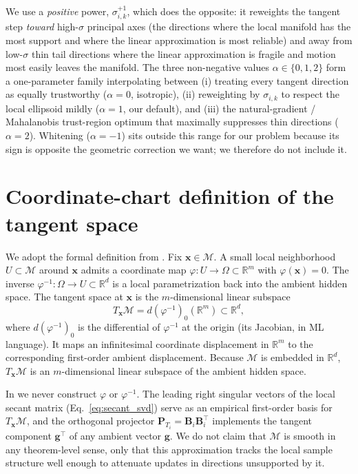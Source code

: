 We use a \emph{positive} power, $\sigma_{i,k}^{+1}$, which does the opposite: it reweights the tangent step \emph{toward} high-$\sigma$ principal axes (the directions where the local manifold has the most support and where the linear approximation is most reliable) and away from low-$\sigma$ thin tail directions where the linear approximation is fragile and motion most easily leaves the manifold. The three non-negative values $\alpha \in \{0, 1, 2\}$ form a one-parameter family interpolating between (i) treating every tangent direction as equally trustworthy ($\alpha = 0$, isotropic), (ii) reweighting by $\sigma_{i,k}$ to respect the local ellipsoid mildly ($\alpha = 1$, our default), and (iii) the natural-gradient / Mahalanobis trust-region optimum that maximally suppresses thin directions ($\alpha = 2$). Whitening ($\alpha = -1$) sits outside this range for our problem because its sign is opposite the geometric correction we want; we therefore do not include it.

\section{Coordinate-chart definition of the tangent space}
\label{sec:appendix_geometry}

We adopt the formal definition from \citet{tu-2011-manifolds}. Fix $\mathbf{x} \in \mathcal{M}$. A small local neighborhood $U \subset \mathcal{M}$ around $\mathbf{x}$ admits a coordinate map $\varphi : U \to \Omega \subset \mathbb{R}^m$ with $\varphi(\mathbf{x}) = 0$. The inverse $\varphi^{-1} : \Omega \to U \subset \mathbb{R}^d$ is a local parametrization back into the ambient hidden space. The tangent space at $\mathbf{x}$ is the $m$-dimensional linear subspace
\begin{equation}
T_{\mathbf{x}}\mathcal{M} = d(\varphi^{-1})_{0}(\mathbb{R}^m) \subset \mathbb{R}^d,
\end{equation}
where $d(\varphi^{-1})_0$ is the differential of $\varphi^{-1}$ at the origin (its Jacobian, in ML language). It maps an infinitesimal coordinate displacement in $\mathbb{R}^m$ to the corresponding first-order ambient displacement. Because $\mathcal{M}$ is embedded in $\mathbb{R}^d$, $T_{\mathbf{x}}\mathcal{M}$ is an $m$-dimensional linear subspace of the ambient hidden space.

In \TanGCE{} we never construct $\varphi$ or $\varphi^{-1}$. The leading right singular vectors of the local secant matrix (Eq.~\ref{eq:secant_svd}) serve as an empirical first-order basis for $T_{\mathbf{x}}\mathcal{M}$, and the orthogonal projector $\mathbf{P}_{T_i} = \mathbf{B}_i \mathbf{B}_i^\top$ implements the tangent component $\mathbf{g}^{\top}$ of any ambient vector $\mathbf{g}$. We do not claim that $\mathcal{M}$ is smooth in any theorem-level sense, only that this approximation tracks the local sample structure well enough to attenuate updates in directions unsupported by it.

